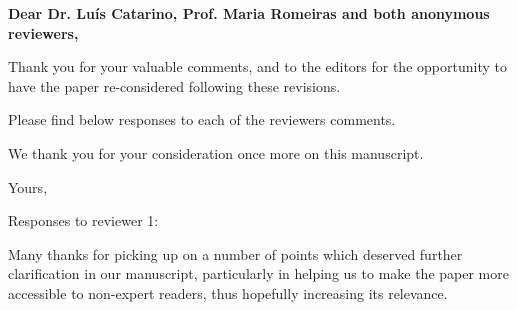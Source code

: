 \documentclass[a4paper]{letter}
\begin{document}



\begin{letter}{} %


	\opening{\textbf{Dear Dr. Lu\'{i}s Catarino, Prof. Maria Romeiras and both anonymous reviewers,}}
 
Thank you for your valuable comments, and to the editors for the opportunity to have the paper re-considered following these revisions.

Please find below responses to each of the reviewers comments.

We thank you for your consideration once more on this manuscript.


\vspace{\parskip} %
\closing{Yours,}
\vspace{2\parskip} %


\newpage{}
Responses to reviewer 1:

Many thanks for picking up on a number of points which deserved further clarification in our manuscript, particularly in helping us to make the paper more accessible to non-expert readers, thus hopefully increasing its relevance.


\end{letter}
\end{document}
